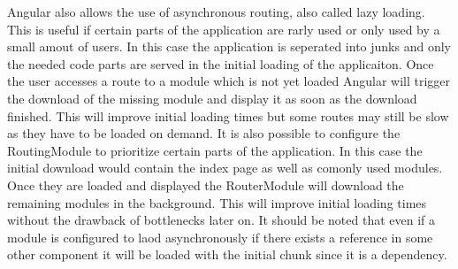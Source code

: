 Angular also allows the use of asynchronous routing, also called lazy loading. This is useful if certain parts of the application are rarly used or only used by a small amout of users. In this case the application is seperated into junks and only the needed code parts are served in the initial loading of the applicaiton. Once the user accesses a route to a module which is not yet loaded Angular will trigger the download of the missing module and display it as soon as the download finished. This will improve initial loading times but some routes may still be slow as they have to be loaded on demand. It is also possible to configure the RoutingModule to prioritize certain parts of the application. In this case the initial download would contain the index page as well as comonly used modules. Once they are loaded and displayed the RouterModule will download the remaining modules in the background. This will improve initial loading times without the drawback of bottlenecks later on. It should be noted that even if a module is configured to laod asynchronously if there exists a reference in some other component it will be loaded with the initial chunk since it is a dependency.

